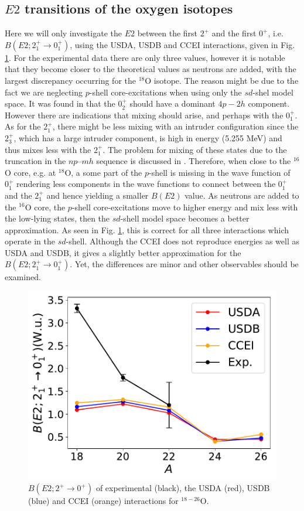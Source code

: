 \subsection{$ E2 $ transitions of the oxygen isotopes}
Here we will only investigate the $E2$ between the first $2^+$ and the first $0^+$, i.e. $B(E2; 2_1^+ \rightarrow 0_1^+)$, using the USDA, USDB and CCEI interactions, given in Fig. \ref{oxygen-be2}. For the experimental data there are only three values, however it is notable that they become closer to the theoretical values as neutrons are added, with the largest discrepancy occurring for the $^{18}$O isotope. The reason might be due to the fact we are neglecting $p$-shell core-excitations when using only the $sd$-shel model space. It was found in \cite{Lawson1976} that the $0_2^+$ should have a dominant $4p-2h$ component. However there are indications that mixing should arise, and perhaps with the $0_1^+$. As for the $2^+_1$, there might be less mixing with an intruder configuration since the $2^+_3$, which has a large intruder component, is high in energy (5.255 MeV) 	 and thus mixes less with the $2^+_1$. The problem for mixing of these states due to the truncation in the $np–mh$ sequence is discussed in \cite{Warburton1992a}. Therefore, when close to the $^{16}$O core, e.g. at $^{18}$O, a some part of the $p$-shell is missing in the wave function of $0^+_1$ rendering less components in the wave functions to connect between the $0_1^+$ and the $2_1^+$ and hence yielding a smaller $B(E2)$ value. As neutrons are added to the $^{16} $O core, the $p$-shell core-excitations move to higher energy and mix less with the low-lying states, then the $sd$-shell model space becomes a better approximation. As seen in Fig. \ref{oxygen-be2}, this is correct for all three interactions which operate in the $sd$-shell. Although the CCEI does not reproduce energies as well as USDA and USDB, it gives a slightly better approximation for the $B(E2; 2_1^+ \rightarrow 0_1^+)$. Yet, the differences are minor and other observables should be examined.

\begin{figure}[h]
\includegraphics[width=1\linewidth]{../figures/oxygen-be2.pdf}
\caption{$B(E2; 2^+ \rightarrow 0^+)$ of experimental (black), the USDA (red), USDB (blue) and CCEI (orange) interactions for $^{18-26}$O. \label{oxygen-be2}}
\end{figure}


